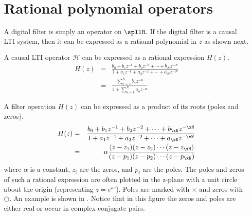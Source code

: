 
\section{Rational polynomial operators}
A digital filter is simply an operator on $\spllR$.
If the digital filter is a causal LTI system, then it can be expressed as 
a rational polynomial in $z$ as shown next.

\begin{lemma}
A causal LTI operator $\mathcal{H}$ can be expressed as a rational expression $H(z)$.
\begin{eqnarray*}
   H(z) &=& \frac{b_0 + b_1z^{-1} + b_2z^{-2} + \cdots + b_Nz^{-N}}
                 {1   + a_1z^{-1} + a_2z^{-2} + \cdots + a_Nz^{-N}}
   \\   &=& \frac{\sum\limits_{n=0}^{N} b_n z^{-n}}
                 {1   + \sum\limits_{n=1}^{N} a_n z^{-n}}
\end{eqnarray*}
\end{lemma}


A filter operation $H(z)$ can be expressed as a product of its roots (poles and zeros).
\begin{eqnarray*}
   H(z) &=& \frac{b_0 + b_1z^{-1} + b_2z^{-2} + \cdots + b_\xN z^{-\xN}}
                 {1   + a_1z^{-1} + a_2z^{-2} + \cdots + a_\xN z^{-\xN}}
   \\   &=& \alpha\frac{(z-z_1)(z-z_2)\cdots(z-z_\xN)}
                 {(z-p_1)(z-p_2)\cdots(z-p_\xN)}
\end{eqnarray*}
where $\alpha$ is a constant, $z_i$ are the zeros, and $p_i$ are the poles.
The poles and zeros of such a rational expression are often plotted in the z-plane with a unit circle
about the origin (representing $z=e^{i\omega}$).
Poles are marked with $\times$ and zeros with $\bigcirc$.
An example is shown in .  
Notice that in this figure the zeros and poles are either real or occur in 
complex conjugate pairs.

